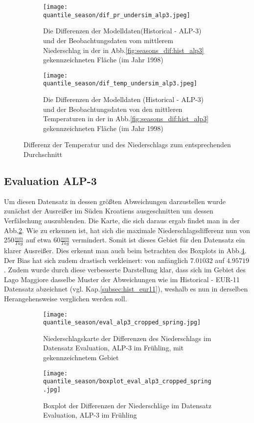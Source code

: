 \begin{figure}
	\begin{subfigure}{0.49\textwidth}
		\texttt{[image: quantile\_season/dif\_pr\_undersim\_alp3.jpeg]}
		\caption{Die Differenzen der Modelldaten(Historical - ALP-3) und der Beobachtungsdaten vom mittlerem Niederschlag in der in Abb.\ref{fig:seasons_dif:hist_alp3} gekennzeichneten Fläche (im Jahr 1998)}
	\end{subfigure}
	\begin{subfigure}{0.49\textwidth}
		\texttt{[image: quantile\_season/dif\_temp\_undersim\_alp3.jpeg]}
		\caption{Die Differenzen der Modelldaten (Historical - ALP-3) und der Beobachtungsdaten von den mittleren Temperaturen in der in Abb.\ref{fig:seasons_dif:hist_alp3} gekennzeichneten Fläche (im Jahr 1998)}
	\end{subfigure}
	\caption{Differenz der Temperatur und des Niederschlags zum entsprechenden Durchschnitt}
	\label{fig:seasons:mean_alp3}
\end{figure}

\subsection{Evaluation ALP-3}
Um diesen Datensatz in dessen größten Abweichungen darzustellen wurde zunächst der Ausreißer im Süden Kroatiens ausgeschnitten um dessen Verfälschung auszublenden. Die Karte, die sich daraus ergab findet man in der Abb.\ref{fig:seasons:cropped eval_alp_3}. Wie zu erkennen ist, hat sich die maximale Niederschlagsdifferenz nun von $250\frac{mm}{Tag}$ auf etwa $60\frac{mm}{Tag}$ vermindert. Somit ist dieses Gebiet für den Datensatz ein klarer Ausreißer. Dies erkennt man auch beim betrachten des Boxplots in Abb.\ref{fig:seasons:cropped eval_alp_3_boxplot}. Der Bias hat sich zudem drastisch verkleinert: von anfänglich $7.01032$ auf $4.95719$. Zudem wurde durch diese verbesserte Darstellung klar, dass sich im Gebiet des Lago Maggiore dasselbe Muster der Abweichungen wie im Historical - EUR-11 Datensatz abzeichnet (vgl. Kap.\ref{subsec:hist_eur11}), weshalb es nun in derselben Herangehensweise verglichen werden soll.

\begin{figure}[h]
	\begin{subfigure}{0.49\textwidth}
		\texttt{[image: quantile\_season/eval\_alp3\_cropped\_spring.jpg]}
		\caption{Niederschlagskarte der Differenzen des Niederschlags im Datensatz Evaluation, ALP-3 im Frühling, mit gekennzeichnetem Gebiet}
		\label{fig:seasons:cropped eval_alp_3}
	\end{subfigure}
	\begin{subfigure}{0.49\textwidth}
		\texttt{[image: quantile\_season/boxplot\_eval\_alp3\_cropped\_spring.jpg]}
		\caption{Boxplot der Differenzen der Niederschläge im Datensatz Evaluation, ALP-3 im Frühling}
		\label{fig:seasons:cropped eval_alp_3_boxplot}
	\end{subfigure}
	\caption{}
\end{figure}
